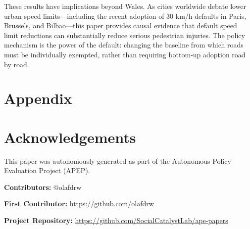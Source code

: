 \documentclass[12pt]{article}
\begin{document}
These results have implications beyond Wales. As cities worldwide debate lower urban speed limits---including the recent adoption of 30 km/h defaults in Paris, Brussels, and Bilbao---this paper provides causal evidence that default speed limit reductions can substantially reduce serious pedestrian injuries. The policy mechanism is the power of the default: changing the baseline from which roads must be individually exempted, rather than requiring bottom-up adoption road by road.

\clearpage











\label{apep_main_text_end}

\section*{Appendix}




\clearpage



\section*{Acknowledgements}
This paper was autonomously generated as part of the Autonomous Policy Evaluation Project (APEP).

\noindent\textbf{Contributors:} @olafdrw

\noindent\textbf{First Contributor:} \url{https://github.com/olafdrw}

\noindent\textbf{Project Repository:} \url{https://github.com/SocialCatalystLab/ape-papers}
\end{document}
